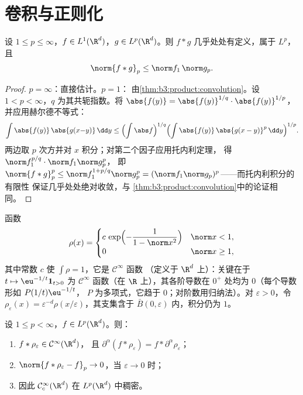 \section{卷积与正则化}

\begin{theorem}[杨不等式]\label{thm:b3:lp:young}
设 $1 \leq p \leq \infty$，$f \in L^1(\R^d)$，$g \in
L^p(\R^d)$。则 $f * g$ 几乎处处有定义，属于 $L^p$，
且
\[
\norm{f * g}_p \leq \norm f_1\,\norm g_p .
\]
\end{theorem}

\begin{proof}
$p = \infty$：直接估计。$p = 1$：
由\cref{thm:b3:product:convolution}。设 $1 < p < \infty$，$q$
为其共轭指数。将 $\abs{f(y)} = \abs{f(y)}^{1/q}\cdot
\abs{f(y)}^{1/p}$，并应用赫尔德不等式：
\[
\int\abs{f(y)}\,\abs{g(x{-}y)}\,\dd y
\leq \Bigl(\int\abs f\Bigr)^{1/q}
\Bigl(\int\abs{f(y)}\,\abs{g(x - y)}^p\,\dd y\Bigr)^{1/p} .
\]
两边取 $p$ 次方并对 $x$ 积分；对第二个因子应用托内利定理，
得 $\norm f_1^{p/q}\cdot\norm f_1\norm g_p^p$，
即 $\norm{f*g}_p^p \leq \norm f_1^{1 + p/q}\norm g_p^p =
(\norm f_1\norm g_p)^p$——而托内利积分的有限性
保证几乎处处绝对收敛，与
\cref{thm:b3:product:convolution}中的论证相同。
\end{proof}

\begin{definition}[磨光子]\label{def:b3:lp:mollifier}
函数
\[
\rho(x) = \begin{cases}
c\,\exp\Bigl(-\dfrac{1}{1 - \norm x^2}\Bigr) & \norm x < 1,\\
0 & \norm x \geq 1,
\end{cases}
\]
其中常数 $c$ 使 $\int\rho = 1$，它是 $\mathcal C^\infty$ 函数
（定义于 $\R^d$ 上）：关键在于 $t \mapsto \eu^{-1/t}\mathbf
1_{t>0}$ 为 $\mathcal C^\infty$ 函数（在 $\R$ 上），其各阶导数在
$0^+$ 处均为 $0$（每个导数形如 $P(1/t)\eu^{-1/t}$，
$P$ 为多项式，它趋于 $0$；对阶数用归纳法）。对
$\varepsilon > 0$，令 $\rho_\varepsilon(x) =
\varepsilon^{-d}\rho(x/\varepsilon)$，其支集含于 $\bar B(0,
\varepsilon)$ 内，积分仍为 $1$。
\end{definition}

\begin{theorem}[正则化]\label{thm:b3:lp:regularization}
设 $1 \leq p < \infty$，$f \in L^p(\R^d)$。则：
\begin{enumerate}
  \item $f * \rho_\varepsilon \in \mathcal C^\infty(\R^d)$，
        且 $\partial^\alpha(f * \rho_\varepsilon) = f *
        \partial^\alpha\rho_\varepsilon$；
  \item $\norm{f * \rho_\varepsilon - f}_p \to 0$，当
        $\varepsilon \to 0$ 时；
  \item 因此 $\mathcal C^\infty_c(\R^d)$ 在
        $L^p(\R^d)$ 中稠密。
\end{enumerate}
\end{theorem}

